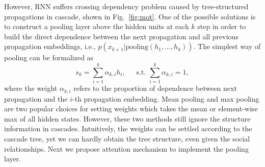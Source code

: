 
However, RNN suffers crossing dependency problem caused by tree-structured
propagations in cascade, shown in Fig.~\ref{fig:mot}. One of the possible
solutions is to construct a pooling layer above the hidden
units at each $k$ step in order to build the direct dependence between the
next propagation and all previous propagation embeddings,
i.e., $p(x_{k+1} | \text{pooling}(h_1,\ldots,h_k))$. The simplest way of pooling can
be formalized as
\begin{equation}
\label{eq:pooling_frame}
s_k=\sum_{i=1}^k \alpha_{k,i} h_i \text{,~~~~~s.t.~} \sum_{i=1}^k
\alpha_{k,i}=1,
\end{equation}
where the weight $\alpha_{k,i}$ refers to the proportion of dependence between
next propagation and the $i$-th propagation embedding. Mean pooling and max
pooling are two popular choices for setting weights which takes the mean or element-wise
max of all hidden states. However, these two methods still ignore the structure
information in cascades.
Intuitively, the weights can be settled according to the cascade tree, yet we
can hardly obtain the tree structure, even given the social relationships. Next
we propose attention mechanism to implement the pooling layer. 

